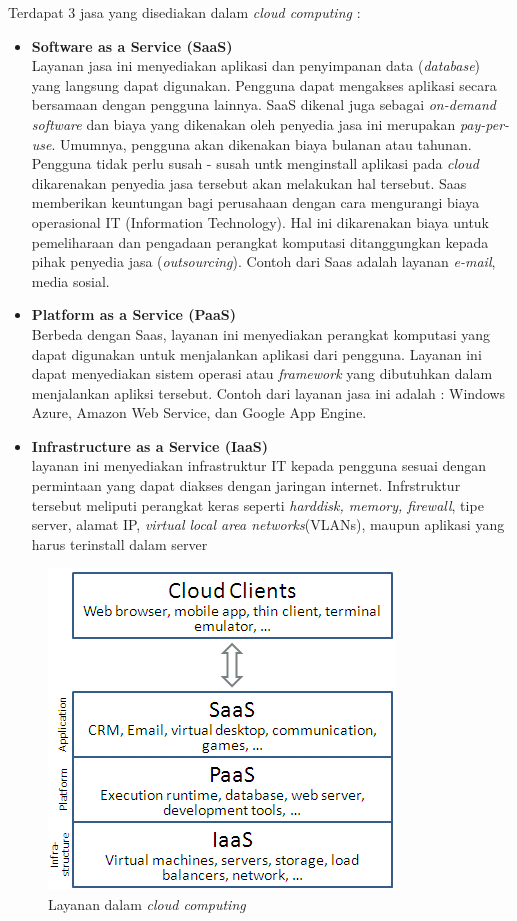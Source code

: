 Terdapat 3 jasa yang disediakan dalam \textit{cloud computing} \cite{Cloud Computing Research and Development Trend} :
\begin{itemize}
	\item \textbf{Software as a Service (SaaS)}\\
	Layanan jasa ini menyediakan aplikasi dan penyimpanan data (\textit{database}) yang langsung dapat digunakan. Pengguna dapat mengakses aplikasi secara bersamaan dengan pengguna lainnya. SaaS dikenal juga sebagai \textit{on-demand software} dan biaya yang dikenakan oleh penyedia jasa ini merupakan \textit{pay-per-use}. Umumnya, pengguna akan dikenakan biaya bulanan atau tahunan. Pengguna tidak perlu susah - susah untk menginstall aplikasi pada \textit{cloud} dikarenakan penyedia jasa tersebut akan melakukan hal tersebut. Saas memberikan keuntungan bagi perusahaan dengan cara mengurangi biaya operasional IT (Information Technology). Hal ini dikarenakan biaya untuk pemeliharaan dan pengadaan perangkat komputasi ditanggungkan kepada pihak penyedia jasa (\textit{outsourcing}). Contoh dari Saas adalah layanan \textit{e-mail}, media sosial.
	
	\item \textbf{Platform as a Service (PaaS)}\\
	Berbeda dengan Saas, layanan ini menyediakan perangkat komputasi yang dapat digunakan untuk menjalankan aplikasi dari pengguna. Layanan ini dapat menyediakan sistem operasi atau \textit{framework} yang dibutuhkan dalam menjalankan apliksi tersebut. Contoh dari layanan jasa ini adalah : Windows Azure, Amazon Web Service, dan Google App Engine.
	
	\item \textbf{Infrastructure as a Service (IaaS)}\\
	layanan ini menyediakan infrastruktur IT kepada pengguna sesuai dengan permintaan yang dapat diakses dengan jaringan internet. Infrstruktur tersebut meliputi perangkat keras seperti \textit{harddisk, memory, firewall}, tipe server, alamat IP, \textit{virtual local area networks}(VLANs), maupun aplikasi yang harus terinstall dalam server 
	  
\end{itemize}
\begin{figure}
	\centering
	\includegraphics[scale=0.6]{layanan_cloud.png}
	\caption{Layanan dalam \textit{cloud computing} \cite{Layanan cloud}}
\end{figure}

